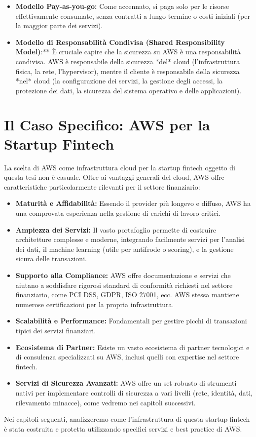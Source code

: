\documentclass[a4paper,12pt]{report}
\begin{document}
\begin{itemize}
\begin{itemize}
        \end{itemize}
    \item \textbf{Modello Pay-as-you-go:} Come accennato, si paga solo per le risorse effettivamente consumate, senza contratti a lungo termine o costi iniziali (per la maggior parte dei servizi).
    \item \textbf{Modello di Responsabilità Condivisa (Shared Responsibility Model)}:** È cruciale capire che la sicurezza su AWS è una responsabilità condivisa. AWS è responsabile della sicurezza *del* cloud (l'infrastruttura fisica, la rete, l'hypervisor), mentre il cliente è responsabile della sicurezza *nel* cloud (la configurazione dei servizi, la gestione degli accessi, la protezione dei dati, la sicurezza del sistema operativo e delle applicazioni).
\end{itemize}

\section{Il Caso Specifico: AWS per la Startup Fintech}
\label{sec:aws-for-fintech}

La scelta di AWS come infrastruttura cloud per la startup fintech oggetto di questa tesi non è casuale. Oltre ai vantaggi generali del cloud, AWS offre caratteristiche particolarmente rilevanti per il settore finanziario:
\begin{itemize}
    \item \textbf{Maturità e Affidabilità:} Essendo il provider più longevo e diffuso, AWS ha una comprovata esperienza nella gestione di carichi di lavoro critici.
    \item \textbf{Ampiezza dei Servizi:} Il vasto portafoglio permette di costruire architetture complesse e moderne, integrando facilmente servizi per l'analisi dei dati, il machine learning (utile per antifrode o scoring), e la gestione sicura delle transazioni.
    \item \textbf{Supporto alla Compliance:} AWS offre documentazione e servizi che aiutano a soddisfare rigorosi standard di conformità richiesti nel settore finanziario, come PCI DSS, GDPR, ISO 27001, ecc. AWS stessa mantiene numerose certificazioni per la propria infrastruttura.
    \item \textbf{Scalabilità e Performance:} Fondamentali per gestire picchi di transazioni tipici dei servizi finanziari.
    \item \textbf{Ecosistema di Partner:} Esiste un vasto ecosistema di partner tecnologici e di consulenza specializzati su AWS, inclusi quelli con expertise nel settore fintech.
    \item \textbf{Servizi di Sicurezza Avanzati:} AWS offre un set robusto di strumenti nativi per implementare controlli di sicurezza a vari livelli (rete, identità, dati, rilevamento minacce), come vedremo nei capitoli successivi.
\end{itemize}
Nei capitoli seguenti, analizzeremo come l'infrastruttura di questa startup fintech è stata costruita e protetta utilizzando specifici servizi e best practice di AWS.
\end{document}
